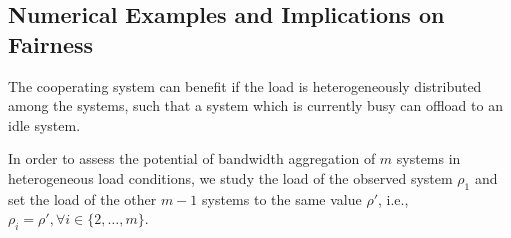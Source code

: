 \subsection{Numerical Examples and Implications on Fairness}\label{sec:aggregation:imbalanced:numerical_examples}

The cooperating system can benefit if the load is heterogeneously distributed among the systems, such that a system which is currently busy can offload to an idle system.

In order to assess the potential of bandwidth aggregation of $m$ systems in heterogeneous load conditions, we study the load of the observed system $\rho_1$ and set the load of the other $m-1$ systems to the same value $\rho'$, i.e., $\rho_i=\rho',\forall i\in\{2,\dotsc,m\}$.



